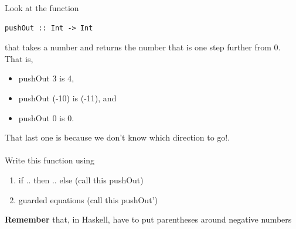 \documentclass{article}
\begin{document}
\pagebreak
\begin{exercise}
 
 Look at the function 
  \begin{lstlisting}
pushOut :: Int -> Int
  \end{lstlisting}   

  that takes a number and returns the number that is one step further from 0. 
  That is, 
  \begin{itemize}
    \item pushOut 3 is 4, 
    \item pushOut (-10) is (-11), and
    \item pushOut 0 is 0.
  \end{itemize}

That last one is because we don’t know which direction to go!.\\ \\


Write this function using 
\begin{enumerate}
  \item if .. then .. else  (call this pushOut)
  \item guarded equations    (call this pushOut')
\end{enumerate}
 
  \textbf{Remember} that, in Haskell, have to put parentheses around negative numbers
  \end{exercise}
\end{document}
